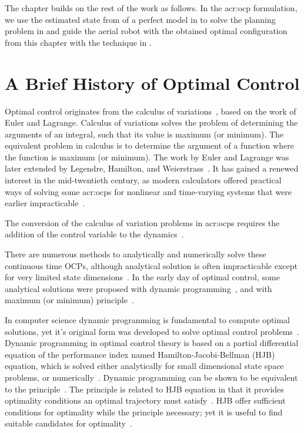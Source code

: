 The chapter builds on the rest of the work as follows. In the \Gls{acr:ocp} formulation, we use the estimated state from  of a perfect model in  to solve the planning problem in  and guide the aerial robot with the obtained optimal configuration from this chapter with the technique in .

\section{A Brief History of Optimal Control}

Optimal control originates from the calculus of variations~\citep{sethi2019optimal}, based on the work of Euler and Lagrange. Calculus of variations solves the problem of determining the arguments of an integral, such that its value is maximum (or minimum). The equivalent problem in calculus is to determine the argument of a function where the function is maximum (or minimum). The work by Euler and Lagrange was later extended by Legendre, Hamilton, and Weierstrass~\citep{paulen2016solution}. It has gained a renewed interest in the mid-twentieth century, as modern calculators offered practical ways of solving some \Gls{acr:ocp}s for nonlinear and time-varying systems that were earlier impracticable~\citep{bryson1975applied}.

The conversion of the calculus of variation problems in \Gls{acr:ocp}s requires the addition of the control variable to the dynamics~\citep{sethi2019optimal}. 

There are numerous methods to analytically and numerically solve these continuous time OCPs, although analytical solution is often impracticable except for very limited state dimensions~\citep{rawlings2017model}. In the early day of optimal control, some analytical solutions were proposed with dynamic programming~\citep{bellman1957dynamic}, and with maximum (or minimum) principle~\citep{pontryagin1962mathematical}. 

In computer science dynamic programming is fundamental to compute optimal solutions, yet it's original form was developed to solve optimal control problems~\citep{lavalle2006planning}. Dynamic programming in optimal control theory is based on a partial differential equation of the performance index named Hamilton-Jacobi-Bellman (HJB) equation, which is solved either analytically for small dimensional state space problems, or numerically~\citep{rawlings2017model}. Dynamic programming can be shown to be equivalent to the principle~\citep{paulen2016solution}. The principle is related to HJB equation in that it provides optimality conditions an optimal trajectory must satisfy~\citep{lavalle2006planning}. HJB offer sufficient conditions for optimality while the principle necessary; yet it is useful to find suitable candidates for optimality~\citep{lavalle2006planning}.


